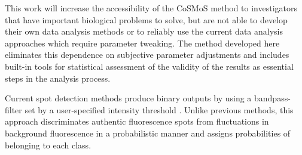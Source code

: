 This work will increase the accessibility of the CoSMoS method to investigators that have important biological problems to solve, but are not able to develop their own data analysis methods or to reliably use the current data analysis approaches which require parameter tweaking. The method developed here eliminates this dependence on subjective parameter adjustments and includes built-in tools for statistical assessment of the validity of the results as essential steps in the analysis process.


Current spot detection methods produce binary outputs by using a bandpass-filter set by a user-specified intensity threshold \cite{Friedman2015-nx, Smith2019-yb}. Unlike previous methods, this approach discriminates authentic fluorescence spots from fluctuations in background fluorescence in a probabilistic manner and assigns probabilities of belonging to each class.